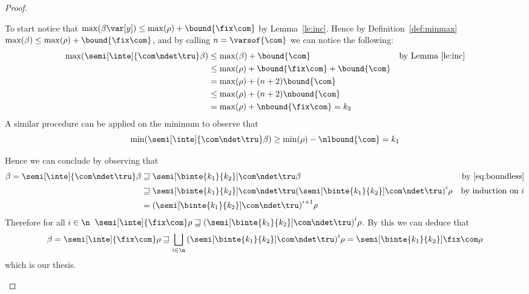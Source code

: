 \begin{proof}
\begin{inductive}
\begin{description}
      To start notice that
      \(\max(\beta\var[y]) \leq \max(\rho) + \bound{\fix\com}\) by
      Lemma~\ref{le:inc}. Hence by Definition~\ref{def:minmax}
      \(\max(\beta) \leq \max(\rho) + \bound{\fix\com}\), and by
      calling \(n = \varsof{\com}\) we can notice the following:
      \begin{align*}
        \max(\semi[\inte]{\com\ndet\tru}\beta) & \leq \max(\beta) + \bound{\com} & \text{by Lemma~\ref{le:inc}}\\
                                               & \leq \max(\rho) + \bound{\fix\com} + \bound{\com} \\
                                               & = \max(\rho) + (n+2)\bound{\com} \\
                                               & \leq \max(\rho) + (n+2)\nbound{\com} \\
                                               & = \max(\rho) + \nbound{\fix\com} = k_2
      \end{align*}
      A similar procedure can be applied on the minimum to observe
      that
      \[\min(\semi[\inte]{\com\ndet\tru}\beta) \geq \min(\rho) -
        \nlbound{\com}= k_1\]

      Hence we can conclude by observing that
      \begin{align*}
        \beta = \semi[\inte]{\com\ndet\tru}\beta & \sqsupseteq \semi[\binte{k_1}{k_2}]{\com\ndet\tru}\beta  & \text{by~\eqref{eq:boundless}}\\
                                                 & \sqsupseteq \semi[\binte{k_1}{k_2}]{\com\ndet\tru}{\left(\semi[\binte{k_1}{k_2}]{\com\ndet\tru}\right)}^i\rho & \text{by induction on } i \\
        & = {\left(\semi[\binte{k_1}{k_2}]{\com\ndet\tru}\right)}^{i+1}\rho
      \end{align*}
      Therefore for all \(i\in\n\)
      \(\semi[\inte]{\fix\com}\rho \sqsupseteq
      {\left(\semi[\binte{k_1}{k_2}]{\com\ndet\tru}\right)}^{i}\rho\). By
      this we can deduce that
      \begin{equation*}
        \beta = \semi[\inte]{\fix\com}\rho \sqsupseteq \bigsqcup_{i\in\n}{\left(\semi[\binte{k_1}{k_2}]{\com\ndet\tru}\right)}^i\rho = \semi[\binte{k_1}{k_2}]{\fix\com}\rho
      \end{equation*}
      which is our thesis.
    \end{description}
  \end{inductive}
\end{proof}


